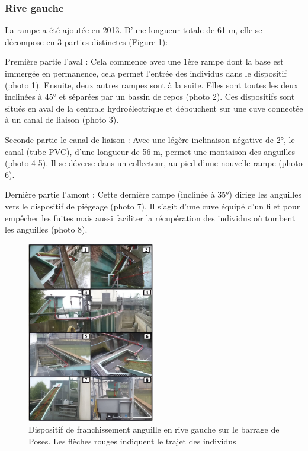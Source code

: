 \documentclass[11pt,titlepage,twoside]{article}\usepackage[]{graphicx}\usepackage[table]{xcolor}
\begin{document}
\subsubsection{Rive gauche}

La rampe a été ajoutée en 2013. D’une longueur totale de 61 m, elle se décompose en 3 parties distinctes (Figure \ref{RG2}):

Première partie l’aval : Cela commence avec une 1ère rampe dont la base est immergée en permanence, cela permet l’entrée des individus dans le dispositif (photo 1). Ensuite, deux autres rampes sont à la suite. Elles sont toutes les deux inclinées à 45° et séparées par un bassin de repos (photo 2). Ces dispositifs sont situés en aval de la centrale hydroélectrique et débouchent sur une cuve connectée à un canal de liaison (photo 3). 

Seconde partie le canal de liaison : Avec une légère inclinaison négative de 2°, le canal (tube PVC), d’une longueur de 56 m, permet une montaison des anguilles (photo 4-5). Il se déverse dans un collecteur, au pied d’une nouvelle rampe (photo 6). 

Dernière partie l’amont : Cette dernière rampe (inclinée à 35°) dirige les anguilles vers le dispositif de piégeage (photo 7). Il s’agit d’une cuve équipé d’un filet pour empêcher les fuites mais aussi faciliter la récupération des individus où tombent les anguilles (photo 8). 

\begin{figure}[htpb]
\centering
\includegraphics[width=0.5\textwidth]{RG2}
\caption{Dispositif de franchissement anguille en rive gauche sur le barrage de Poses. Les flèches rouges indiquent le trajet des individus}
\label{RG2}
\end{figure}
\end{document}
